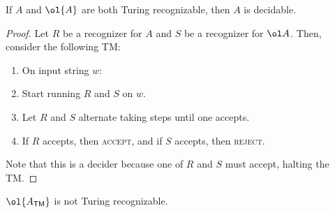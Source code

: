 \documentclass{standalone}
\begin{document}
\begin{theorem}
	 If \(A\) and \(\ol{A}\) are both Turing recognizable, then \(A\) is decidable.
\end{theorem}
\begin{proof}
	Let \(R\) be a recognizer for \(A\) and \(S\) be a recognizer for \(\ol A\). Then, consider the following \textsf{TM}:
	\begin{enumerate}[start=0]
		\item On input string \(w\):
		\item Start running \(R\) and \(S\) on \(w\).
		\item Let \(R\) and \(S\) alternate taking steps until one accepts.
		\item If \(R\) accepts, then \textsc{accept}, and if \(S\) accepts, then \textsc{reject}.
	\end{enumerate}
	Note that this is a decider because one of \(R\) and \(S\) must accept, halting the \textsf{TM}.
\end{proof}

\begin{corollary}
	\(\ol{A_{\textsf{TM}}}\) is not Turing recognizable.
\end{corollary}
\end{document}
